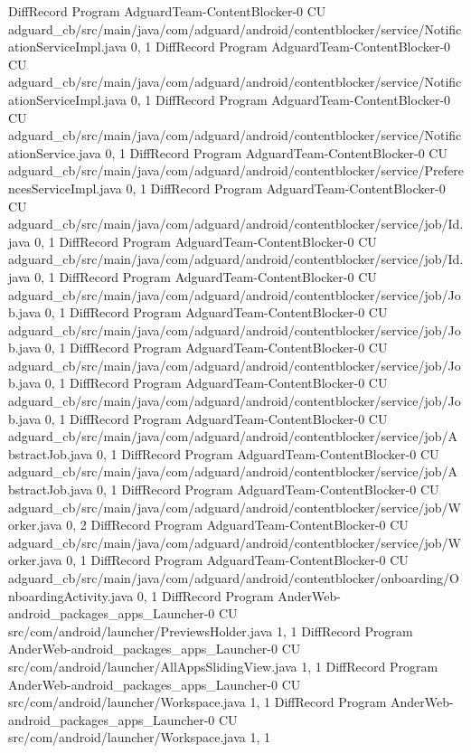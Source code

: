 DiffRecord Program AdguardTeam-ContentBlocker-0 CU adguard_cb/src/main/java/com/adguard/android/contentblocker/service/NotificationServiceImpl.java  {0, 1}
DiffRecord Program AdguardTeam-ContentBlocker-0 CU adguard_cb/src/main/java/com/adguard/android/contentblocker/service/NotificationServiceImpl.java  {0, 1}
DiffRecord Program AdguardTeam-ContentBlocker-0 CU adguard_cb/src/main/java/com/adguard/android/contentblocker/service/NotificationService.java  {0, 1}
DiffRecord Program AdguardTeam-ContentBlocker-0 CU adguard_cb/src/main/java/com/adguard/android/contentblocker/service/PreferencesServiceImpl.java  {0, 1}
DiffRecord Program AdguardTeam-ContentBlocker-0 CU adguard_cb/src/main/java/com/adguard/android/contentblocker/service/job/Id.java  {0, 1}
DiffRecord Program AdguardTeam-ContentBlocker-0 CU adguard_cb/src/main/java/com/adguard/android/contentblocker/service/job/Id.java  {0, 1}
DiffRecord Program AdguardTeam-ContentBlocker-0 CU adguard_cb/src/main/java/com/adguard/android/contentblocker/service/job/Job.java  {0, 1}
DiffRecord Program AdguardTeam-ContentBlocker-0 CU adguard_cb/src/main/java/com/adguard/android/contentblocker/service/job/Job.java  {0, 1}
DiffRecord Program AdguardTeam-ContentBlocker-0 CU adguard_cb/src/main/java/com/adguard/android/contentblocker/service/job/Job.java  {0, 1}
DiffRecord Program AdguardTeam-ContentBlocker-0 CU adguard_cb/src/main/java/com/adguard/android/contentblocker/service/job/Job.java  {0, 1}
DiffRecord Program AdguardTeam-ContentBlocker-0 CU adguard_cb/src/main/java/com/adguard/android/contentblocker/service/job/AbstractJob.java  {0, 1}
DiffRecord Program AdguardTeam-ContentBlocker-0 CU adguard_cb/src/main/java/com/adguard/android/contentblocker/service/job/AbstractJob.java  {0, 1}
DiffRecord Program AdguardTeam-ContentBlocker-0 CU adguard_cb/src/main/java/com/adguard/android/contentblocker/service/job/Worker.java  {0, 2}
DiffRecord Program AdguardTeam-ContentBlocker-0 CU adguard_cb/src/main/java/com/adguard/android/contentblocker/service/job/Worker.java  {0, 1}
DiffRecord Program AdguardTeam-ContentBlocker-0 CU adguard_cb/src/main/java/com/adguard/android/contentblocker/onboarding/OnboardingActivity.java  {0, 1}
DiffRecord Program AnderWeb-android_packages_apps_Launcher-0 CU src/com/android/launcher/PreviewsHolder.java  {1, 1}
DiffRecord Program AnderWeb-android_packages_apps_Launcher-0 CU src/com/android/launcher/AllAppsSlidingView.java  {1, 1}
DiffRecord Program AnderWeb-android_packages_apps_Launcher-0 CU src/com/android/launcher/Workspace.java  {1, 1}
DiffRecord Program AnderWeb-android_packages_apps_Launcher-0 CU src/com/android/launcher/Workspace.java  {1, 1}
